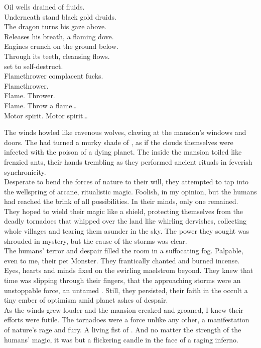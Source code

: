 Oil wells drained of fluids. \\
Underneath stand black gold druids. \\
The dragon turns his gaze above. \\
Releases his breath, a flaming dove. \\
Engines crunch on the ground below. \\
Through its teeth, cleansing  flows. \\
 set to self-destruct. \\
Flamethrower complacent fucks. \\

Flamethrower. \\
Flame. Thrower. \\
Flame. Throw a flame… \\

Motor spirit. Motor spirit… \\




The winds howled like ravenous wolves, clawing at the mansion's windows and doors. The  had turned a murky shade of , as if the clouds themselves were infected with the poison of a dying planet. The  inside the mansion toiled like frenzied ants, their hands trembling as they performed ancient rituals in feverish synchronicity. \\
Desperate to bend the forces of nature to their will, they attempted to tap into the wellspring of arcane, ritualistic magic. Foolish, in my opinion, but the humans had reached the brink of all possibilities. In their minds, only one remained. \\
They hoped to wield their magic like a shield, protecting themselves from the deadly tornadoes that whipped over the land like whirling dervishes, collecting whole villages and tearing them asunder in the sky. The power they sought was shrouded in mystery, but the cause of the storms was clear. \\

The humans' terror and despair filled the room in a suffocating fog. Palpable, even to me, their pet  Monster. They frantically chanted and burned incense. Eyes, hearts and minds fixed on the swirling maelstrom beyond. They knew that time was slipping through their fingers, that the approaching storms were an unstoppable force, an untamed . Still, they persisted, their faith in the occult a tiny ember of optimism amid planet  ashes of despair. \\
As the winds grew louder and the mansion creaked and groaned, I knew their efforts were futile. The tornadoes were a force unlike any other, a manifestation of nature's rage and fury. A living fist of . And no matter the strength of the humans' magic, it was but a flickering candle in the face of a raging inferno. \\

